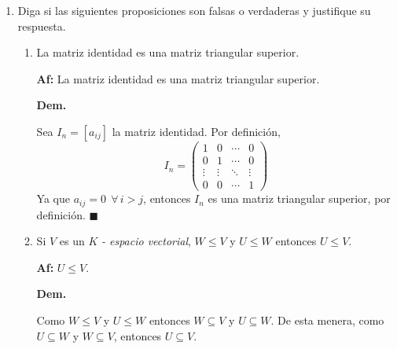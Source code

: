 \documentclass[fleqn]{article}
\begin{document}
    \begin{enumerate}
        \bfseries
        \item Diga si las siguientes proposiciones son falsas o verdaderas y justifique su respuesta.
    
        \begin{enumerate}
            \item La matriz identidad es una matriz triangular superior. \par
            
            \normalfont
            \textbf{Af:} La matriz identidad es una matriz triangular superior. \par

            \hspace{2.7mm}\textbf{Dem.}\par

            Sea $ I_n = [a_{ij}] $ la matriz identidad. Por definición, 
            \begin{equation*}
                I_n = 
                \begin{pmatrix}
                    1      & 0      & \cdots & 0\\ 
                    0      & 1      & \cdots & 0\\
                    \vdots & \vdots & \ddots & \vdots\\
                    0      & 0      & \cdots & 1
                \end{pmatrix}
            \end{equation*}
            Ya que $ a_{ij} = 0 \;\, \forall \, i > j $, entonces $ I_n $ es una matriz triangular superior, por definición. $ \blacksquare $ \par

            \bfseries
            \item Si $ V $ es un $ K $ \textsl{- espacio vectorial}, $ W \leq V $ y $ U \leq W $ entonces $ U \leq V $. \par
            
            \normalfont
            \textbf{Af:} $ U \leq V $. \par

            \hspace{2.7mm}\textbf{Dem.} \par

            Como $ W \leq V $ y $ U \leq W $ entonces $ W \subseteq V $ y $ U \subseteq W $. De esta menera, como $ U \subseteq W $ y $ W \subseteq V $, entonces $ U \subseteq V $. \par


\end{enumerate}
\end{enumerate}
\end{document}
